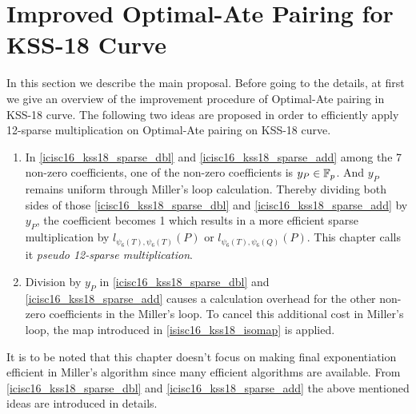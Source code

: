 \section{Improved Optimal-Ate Pairing for KSS-18 Curve} 
In this section we describe the main proposal. Before going to the details, at first we give an overview of the improvement procedure of Optimal-Ate pairing in KSS-18 curve. The following two ideas are proposed in order to efficiently apply 12-sparse multiplication on Optimal-Ate pairing on KSS-18 curve. 
\begin{enumerate}
	\item In \eqref{icisc16_kss18_sparse_dbl} and \eqref{icisc16_kss18_sparse_add} among the 7 non-zero coefficients, one of the non-zero coefficients is $y_P \in {\mathbb{F}}_{p}$. And $y_P$ remains uniform through Miller's loop calculation. Thereby dividing both sides of those \eqref{icisc16_kss18_sparse_dbl} and \eqref{icisc16_kss18_sparse_add} by $y_P$, the coefficient becomes 1 which results in a more efficient sparse multiplication by $l_{\psi_6(T),\psi_6(T)}(P)$ or $l_{\psi_6(T),\psi_6(Q)}(P)$. This chapter calls it \textit{pseudo 12-sparse multiplication}.
	\item Division by $y_P$ in \eqref{icisc16_kss18_sparse_dbl} and \eqref{icisc16_kss18_sparse_add} causes a calculation overhead for the other non-zero coefficients in the Miller's loop. To cancel this  additional cost in Miller's loop, the map introduced in \eqref{isisc16_kss18_isomap} is applied.
\end{enumerate}
It is to be noted that this chapter doesn't focus on making final exponentiation efficient in Miller's algorithm since many efficient algorithms are available.
From \eqref{icisc16_kss18_sparse_dbl} and \eqref{icisc16_kss18_sparse_add} the above mentioned ideas are introduced in details.
